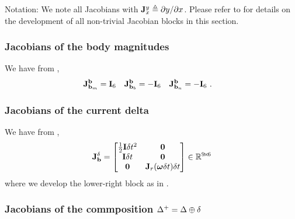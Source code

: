 \newcommand{\jac}[2]{{\bfJ^{#1}_{#2}}}

Notation: 
We note all Jacobians with $\jac{y}{x}\te\dparil{y}{x}$. 
Please refer to  for details on the development of all non-trivial Jacobian blocks in this section.



\subsubsection{Jacobians of the body magnitudes}

We have from ,
%
\begin{align}
\jac{\bfb}{\bfb_m}&=\bfI_6 & \jac{\bfb}{\bfb_b}&=-\bfI_6 & \jac{\bfb}{\bfb_n}&=-\bfI_6
~.
\end{align}

\subsubsection{Jacobians of the current delta}
\label{sec:jac_data}

We have from ,
%
\begin{align}\label{equ:jacobian_current_delta}
\jac{\delta}{\bfb} =
\begin{bmatrix}
\frac12\bfI\dt^2 	& \bf0 \\
\bfI\dt 			& \bf0 \\
\bf0 	          & \bfJ_r(\bw\dt)\dt
\end{bmatrix} 
\in \bbR^{9\tcross6}
\end{align}
%
where we develop the lower-right block as in .





\subsubsection{Jacobians of the commposition $\Delta^+=\Delta\oplus\delta$}

